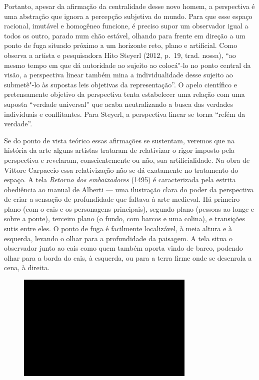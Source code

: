Portanto, apesar da afirmação da centralidade desse novo homem, a
perspectiva é uma abstração que ignora a percepção subjetiva do mundo.
Para que esse espaço racional, imutável e homogêneo funcione, é preciso
supor um observador igual a todos os outro, parado num chão estável,
olhando para frente em direção a um ponto de fuga situado próximo a um
horizonte reto, plano e artificial. Como observa a artista e
pesquisadora Hito Steyerl (2012, p.~19, trad. nossa), ``ao mesmo tempo
em que dá autoridade ao sujeito ao colocá"-lo no ponto central da visão,
a perspectiva linear também mina a individualidade desse sujeito ao
submetê"-lo às supostas leis objetivas da representação''. O apelo
científico e pretensamente objetivo da perspectiva tenta estabelecer uma
relação com uma suposta ``verdade universal'' que acaba neutralizando a
busca das verdades individuais e conflitantes. Para Steyerl, a
perspectiva linear se torna ``refém da verdade''.

Se do ponto de vista teórico essas afirmações se sustentam, veremos que
na história da arte alguns artistas trataram de relativizar o rigor
imposto pela perspectiva e revelaram, conscientemente ou não, sua
artificialidade. Na obra de Vittore Carpaccio essa relativização não se
dá exatamente no tratamento do espaço. A tela \emph{Retorno dos
embaixadores} (1495) é caracterizada pela estrita obediência ao manual
de Alberti --- uma ilustração clara do poder da perspectiva de criar a
sensação de profundidade que faltava à arte medieval. Há primeiro plano
(com o cais e os personagens principais), segundo plano (pessoas ao
longe e sobre a ponte), terceiro plano (o fundo, com barcos e uma
colina), e transições sutis entre eles. O ponto de fuga é facilmente
localizável, à meia altura e à esquerda, levando o olhar para a
profundidade da paisagem. A tela situa o observador junto ao cais como
quem também aporta vindo de barco, podendo olhar para a borda do cais, à
esquerda, ou para a terra firme onde se desenrola a cena, à direita.

\begin{figure}[!ht]
\centering
 \includegraphics[width=85mm]{./imgs/im1.jpg}
\caption{\tiny{}}
\end{figure}

